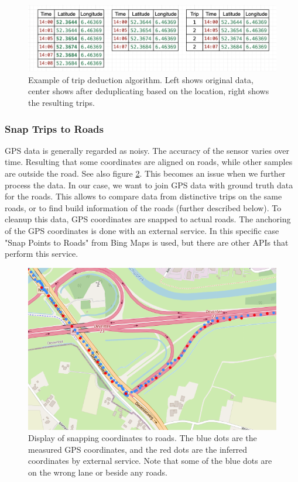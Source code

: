 \begin{figure}[H]
  \centering
  \includegraphics[width=0.95\linewidth]{images/4_data/trip-detection.png}
  \captionsetup{width=.95\textwidth}
  \caption{Example of trip deduction algorithm. Left shows original data, center shows after deduplicating based on the location, right shows the resulting trips.}
  \label{fig:test2}
\end{figure}




\subsubsection{Snap Trips to Roads}
GPS data is generally regarded as noisy. The accuracy of the sensor varies over time. Resulting that some coordinates are aligned on roads, while other samples are outside the road. See also figure \ref{fig:snap-trips}. This becomes an issue when we further process the data. In our case, we want to join GPS data with ground truth data for the roads. This allows to compare data from distinctive trips on the same roads, or to find build information of the roads (further described below). To cleanup this data, GPS coordinates are snapped to actual roads. The anchoring of the GPS coordinates is done with an external service. In this specific case "Snap Points to Roads" from Bing Maps \cite{Snap-Points-to-Roads} is used, but there are other APIs that perform this service.


\begin{figure}[H]
\begin{center}
\includegraphics[width=.95\textwidth,keepaspectratio]{images/4_data/snap-trips.png}
\end{center}
\captionsetup{width=.95\textwidth}
\caption{Display of snapping coordinates to roads. The blue dots are the measured GPS coordinates, and the red dots are the inferred coordinates by external service. Note that some of the blue dots are on the wrong lane or beside any roads.}
\label{fig:snap-trips}
\end{figure}

